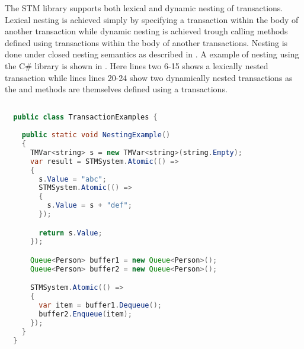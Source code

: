 The \ac{STM} library supports both lexical and dynamic nesting of transactions. Lexical nesting is achieved simply by specifying a transaction within the body of another transaction while dynamic nesting is achieved trough calling methods defined using transactions within the body of another transactions. Nesting is done under closed nesting semantics as described in . A example of nesting using the C\# library is shown in . Here lines two 6-15 shows a lexically nested transaction while lines lines 20-24 show two dynamically nested transactions as the  and  methods are themselves defined using a transactions. 
\begin{lstlisting}[label=lst:library_nesting,
  caption={Library Nesting},
  language=Java,  
  showspaces=false,
  showtabs=false,
  breaklines=true,
  showstringspaces=false,
  breakatwhitespace=true,
  commentstyle=\color{greencomments},
  keywordstyle=\color{bluekeywords},
  stringstyle=\color{redstrings},
  morekeywords={atomic, retry, orElse, var, get, set}]  % Start your code-block

  public class TransactionExamples {
    
    public static void NestingExample()
    {
      TMVar<string> s = new TMVar<string>(string.Empty);
      var result = STMSystem.Atomic(() =>
      {
        s.Value = "abc";
        STMSystem.Atomic(() =>
        {
          s.Value = s + "def";
        });

        return s.Value;
      });

      Queue<Person> buffer1 = new Queue<Person>();
      Queue<Person> buffer2 = new Queue<Person>();

      STMSystem.Atomic(() =>
      {
        var item = buffer1.Dequeue();
        buffer2.Enqueue(item);
      });
    }
  }
\end{lstlisting}

